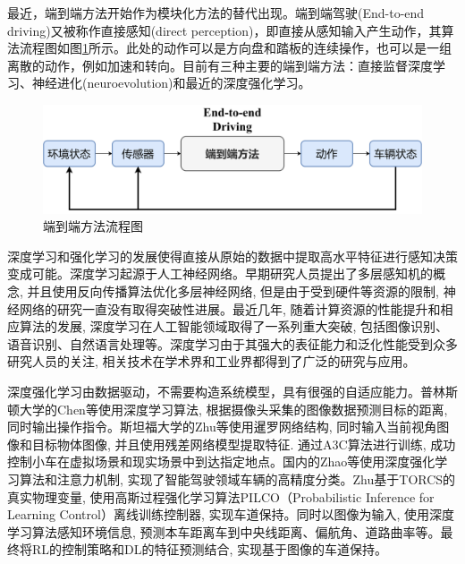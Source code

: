 最近，端到端方法开始作为模块化方法的替代出现。端到端驾驶(End-to-end driving)又被称作直接感知(direct perception)\cite{2015DeepDriving}，即直接从感知输入产生动作，其算法流程图如图\ref{端到端方法流程图}所示。此处的动作可以是方向盘和踏板的连续操作，也可以是一组离散的动作，例如加速和转向。目前有三种主要的端到端方法：直接监督深度学习\cite{1989Alvinn}\cite{2016End}、神经进化\cite{1996Evolution}(neuroevolution)和最近的深度强化学习\cite{2017DRL_end_to_end}。

\begin{figure}[htbp]
  \vspace{13pt} %
  \centering
  \includegraphics[width=1.0\textwidth]{images/chapter1/EndtoEnd_structure.png}
  \caption{端到端方法流程图}\label{端到端方法流程图} %
\end{figure}

深度学习和强化学习的发展使得直接从原始的数据中提取高水平特征进行感知决策变成可能。深度学习起源于人工神经网络。早期研究人员提出了多层感知机的概念, 并且使用反向传播算法优化多层神经网络, 但是由于受到硬件等资源的限制, 神经网络的研究一直没有取得突破性进展。最近几年, 随着计算资源的性能提升和相应算法的发展, 深度学习在人工智能领域取得了一系列重大突破, 包括图像识别、语音识别、自然语言处理等。深度学习由于其强大的表征能力和泛化性能受到众多研究人员的关注, 相关技术在学术界和工业界都得到了广泛的研究与应用。

深度强化学习由数据驱动，不需要构造系统模型，具有很强的自适应能力。普林斯顿大学的Chen等使用深度学习算法, 根据摄像头采集的图像数据预测目标的距离, 同时输出操作指令\cite{2015DeepDriving}。斯坦福大学的Zhu等使用暹罗网络结构, 同时输入当前视角图像和目标物体图像, 并且使用残差网络模型提取特征. 通过A3C算法进行训练, 成功控制小车在虚拟场景和现实场景中到达指定地点\cite{2016Target}。国内的Zhao等使用深度强化学习算法和注意力机制, 实现了智能驾驶领域车辆的高精度分类\cite{2017Deepzhao}。Zhu基于TORCS的真实物理变量, 使用高斯过程强化学习算法PILCO（Probabilistic Inference for Learning Control）离线训练控制器, 实现车道保持。同时以图像为输入, 使用深度学习算法感知环境信息, 预测本车距离车到中央线距离、偏航角、道路曲率等。最终将RL的控制策略和DL的特征预测结合, 实现基于图像的车道保持。


